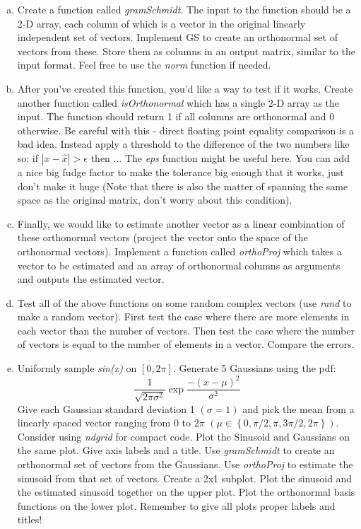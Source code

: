 \documentclass[11pt]{article}
\begin{document}
\begin{enumerate}[a.]
    \item Create a function called \emph{gramSchmidt}.  
    The input to the function should be a 2-D array, 
    each column of which is a vector in the original linearly independent set of vectors. 
    Implement GS to create an orthonormal set of vectors from these.
    Store them as columns in an output matrix, similar to the input format.
    Feel free to use the \emph{norm} function if needed.

    \item After you've created this function, you'd like a way to test if it works.
    Create another function called \emph{isOrthonormal} which has a single 2-D array as the input.
    The function should return 1 if all columns are orthonormal and 0 otherwise.
    Be careful with this - direct floating point equality comparison is a bad idea.
    Instead apply a threshold to the difference of the two numbers like so:
    if $|x-\hat{x}| > \epsilon$ then ... The \emph{eps} function might be useful here.
    You can add a nice big fudge factor to make the tolerance big enough that it works,
    just don't make it huge
    (Note that there is also the matter of spanning the same space as the original matrix,
    don't worry about this condition).

    \item Finally, we would like to estimate another vector as a linear combination of
    these orthonormal vectors (project the vector onto the space of the orthonormal vectors).
    Implement a function called \emph{orthoProj} which takes a vector to be estimated and an array
    of orthonormal columns as arguments and outputs the estimated vector.

    \item Test all of the above functions on some random complex vectors (use \emph{rand} to
    make a random vector).
    First test the case where there are more elements in each vector than the number of vectors.
    Then test the case where the number of vectors is equal to the number of elements in a vector.
    Compare the errors.

    \item Uniformly sample \emph{sin(x)} on $[0, 2\pi]$. Generate 5 Gaussians using the pdf:
    $$
    \frac{1}{\sqrt{2\pi \sigma^2}}\exp{\frac{-(x-\mu)^2}{\sigma^2}}
    $$
    Give each Gaussian standard deviation 1 $(\sigma = 1)$ and pick the mean from a linearly
    spaced vector ranging from $0$ to $2\pi$ $(\mu \in \left\{0, \pi/2, \pi, 3\pi/2, 2\pi\right\})$.
    Consider using \emph{ndgrid} for compact code. 
    Plot the Sinusoid and Gaussians on the same plot. Give axis labels and a title.
    Use \emph{gramSchmidt} to create an orthonormal set of vectors from the Gaussians.
    Use \emph{orthoProj} to estimate the sinusoid from that set of vectors.  Create a 2x1 subplot.
    Plot the sinusoid and the estimated sinusoid together on the upper plot.
    Plot the orthonormal basis functions on the lower plot.
    Remember to give all plots proper labels and titles!

\end{enumerate}
\end{document}
